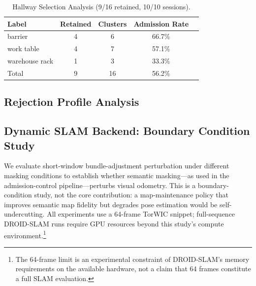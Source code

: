 \documentclass[journal]{IEEEtran}
\begin{document}
\begin{table}[t]
  \centering
  \caption{Hallway Selection Analysis (9/16 retained, 10/10 sessions).}
  \label{tab:hallway_selection}
  \begin{tabular}{lcccc}
    \toprule
    Label & Retained & Clusters & Admission Rate \\
    \midrule
    barrier & 4 & 6 & 66.7\% \\
    work table & 4 & 7 & 57.1\% \\
    warehouse rack & 1 & 3 & 33.3\% \\
    \midrule
    Total & 9 & 16 & 56.2\% \\
    \bottomrule
  \end{tabular}
\end{table}

\subsection{Rejection Profile Analysis}
\label{sec:results_rejection}


\subsection{Dynamic SLAM Backend: Boundary Condition Study}
\label{sec:results_dynamic_motivation}

We evaluate short-window bundle-adjustment perturbation under different masking conditions to establish whether semantic masking---as used in the admission-control pipeline---perturbs visual odometry. This is a boundary-condition study, not the core contribution: a map-maintenance policy that improves semantic map fidelity but degrades pose estimation would be self-undercutting. All experiments use a 64-frame TorWIC snippet; full-sequence DROID-SLAM runs require GPU resources beyond this study's compute environment.\footnote{The 64-frame limit is an experimental constraint of DROID-SLAM's memory requirements on the available hardware, not a claim that 64 frames constitute a full SLAM evaluation.}
\end{document}

